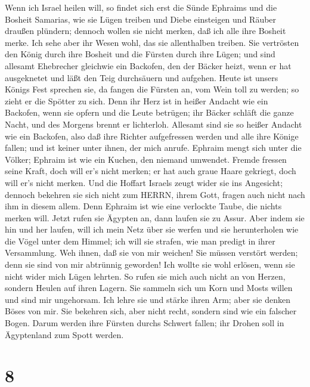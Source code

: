  Wenn ich Israel heilen will, so findet sich erst die Sünde
Ephraims und die Bosheit Samarias, wie sie Lügen treiben und Diebe
einsteigen und Räuber draußen plündern;  dennoch wollen sie
nicht merken, daß ich alle ihre Bosheit merke. Ich sehe aber ihr Wesen
wohl, das sie allenthalben treiben.  Sie vertrösten den
König durch ihre Bosheit und die Fürsten durch ihre Lügen; 
und sind allesamt Ehebrecher gleichwie ein Backofen, den der Bäcker
heizt, wenn er hat ausgeknetet und läßt den Teig durchsäuern und
aufgehen.  Heute ist unsers Königs Fest sprechen sie, da
fangen die Fürsten an, vom Wein toll zu werden; so zieht er die Spötter
zu sich.  Denn ihr Herz ist in heißer Andacht wie ein
Backofen, wenn sie opfern und die Leute betrügen; ihr Bäcker schläft die
ganze Nacht, und des Morgens brennt er lichterloh.  Allesamt
sind sie so heißer Andacht wie ein Backofen, also daß ihre Richter
aufgefressen werden und alle ihre Könige fallen; und ist keiner unter
ihnen, der mich anrufe.  Ephraim mengt sich unter die
Völker; Ephraim ist wie ein Kuchen, den niemand umwendet. 
Fremde fressen seine Kraft, doch will er's nicht merken; er hat auch
graue Haare gekriegt, doch will er's nicht merken.  Und die
Hoffart Israels zeugt wider sie ins Angesicht; dennoch bekehren sie sich
nicht zum HERRN, ihrem Gott, fragen auch nicht nach ihm in diesem allem.
 Denn Ephraim ist wie eine verlockte Taube, die nichts
merken will. Jetzt rufen sie Ägypten an, dann laufen sie zu Assur.
 Aber indem sie hin und her laufen, will ich mein Netz über
sie werfen und sie herunterholen wie die Vögel unter dem Himmel; ich
will sie strafen, wie man predigt in ihrer Versammlung. 
Weh ihnen, daß sie von mir weichen! Sie müssen verstört werden; denn sie
sind von mir abtrünnig geworden! Ich wollte sie wohl erlösen, wenn sie
nicht wider mich Lügen lehrten.  So rufen sie mich auch
nicht an von Herzen, sondern Heulen auf ihren Lagern. Sie sammeln sich
um Korn und Mosts willen und sind mir ungehorsam.  Ich
lehre sie und stärke ihren Arm; aber sie denken Böses von mir.
 Sie bekehren sich, aber nicht recht, sondern sind wie ein
falscher Bogen. Darum werden ihre Fürsten durchs Schwert fallen; ihr
Drohen soll in Ägyptenland zum Spott werden.

\hypertarget{section-7}{%
\section{8}\label{section-7}}

